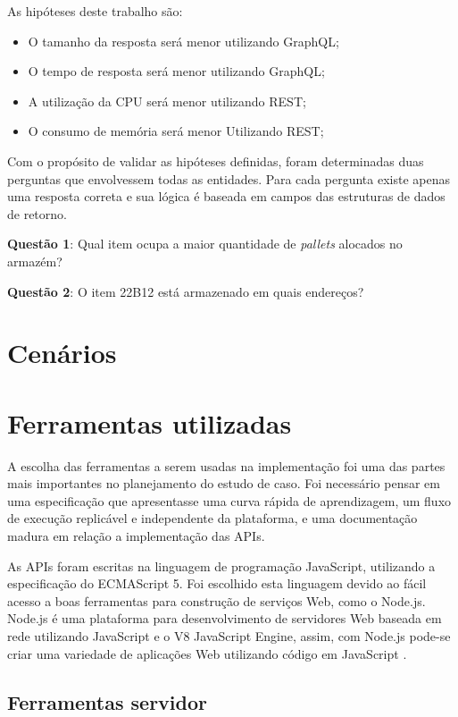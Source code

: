 As hipóteses deste trabalho são: 

\begin{itemize}
\item O tamanho da resposta será menor utilizando GraphQL;
\item O tempo de resposta será menor utilizando GraphQL;
\item A utilização da CPU será menor utilizando REST;
\item O consumo de memória será menor Utilizando REST;
\end{itemize}

Com o propósito de validar as hipóteses definidas, foram determinadas duas perguntas que envolvessem todas as entidades. Para cada pergunta existe apenas uma resposta correta e sua lógica é baseada em campos das estruturas de dados de retorno.

\textbf{Questão 1}: Qual item ocupa a maior quantidade de \textit{pallets} alocados no armazém?

\textbf{Questão 2}: O item 22B12 está armazenado em quais endereços?

\section{Cenários} \label{sec:cenarios}

\section{Ferramentas utilizadas} \label{sec:ferramentas}

A escolha das ferramentas a serem usadas na implementação foi uma das partes mais importantes no planejamento do estudo de caso. Foi necessário pensar em uma especificação que apresentasse uma curva rápida de aprendizagem, um fluxo de execução replicável e independente da plataforma, e uma documentação madura em relação a implementação das APIs.

As APIs foram escritas na linguagem de programação JavaScript, utilizando a especificação do ECMAScript 5. Foi escolhido esta linguagem devido ao fácil acesso a boas ferramentas para construção de serviços Web, como o Node.js. Node.js é uma plataforma para desenvolvimento de servidores Web baseada em rede utilizando JavaScript e o V8 JavaScript Engine, assim, com Node.js pode-se criar uma variedade de aplicações Web utilizando código em JavaScript \cite{node-definition}.

\subsection{Ferramentas servidor}

